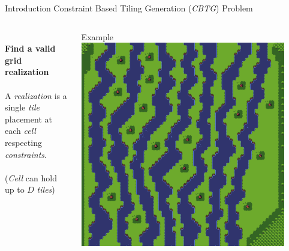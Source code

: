 \documentclass{beamer}
\begin{document}
  \begin{frame}[fragile]{Introduction}
    Constraint Based Tiling Generation (\textit{CBTG}) Problem
    \begin{columns}[T,onlytextwidth]
        \begin{block}{}
          \hfill \\
          \textbf{Find a valid grid realization}
          \hfill \\
          \hfill \\
          A \textit{realization} is a single \textit{tile} placement at each \textit{cell} \\
          respecting \textit{constraints}.
          \hfill \\
          \hfill \\
          (\textit{Cell} can hold up to $D$ \textit{tiles})

        \end{block}
        \begin{block}{Example}
          \includegraphics[width=0.9\textwidth]{img/forestmicro_64x64.pdf}
        \end{block}
    \end{columns}
  \end{frame}
\end{document}
